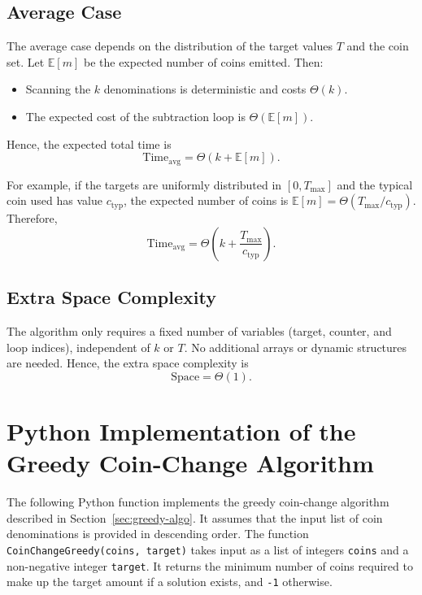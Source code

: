 \documentclass[12pt,a4paper]{report}
\begin{document}
\subsection{Average Case}
The average case depends on the distribution of the target values \(T\) and the coin set. Let \(\mathbb{E}[m]\) be the expected number of coins emitted. Then:

\begin{itemize}
    \item Scanning the \(k\) denominations is deterministic and costs \(\Theta(k)\).
    \item The expected cost of the subtraction loop is \(\Theta(\mathbb{E}[m])\).
\end{itemize}

Hence, the expected total time is
\[
\text{Time}_{\text{avg}} = \Theta\!\left(k + \mathbb{E}[m]\right).
\]

For example, if the targets are uniformly distributed in \([0,T_{\max}]\) and the typical coin used has value \(c_{\mathrm{typ}}\), the expected number of coins is 
\(\mathbb{E}[m] = \Theta(T_{\max} / c_{\mathrm{typ}})\). Therefore,
\[
\text{Time}_{\text{avg}} = \Theta\!\left(k + \frac{T_{\max}}{c_{\mathrm{typ}}}\right).
\]

\subsection{Extra Space Complexity}
The algorithm only requires a fixed number of variables (target, counter, and loop indices), 
independent of \(k\) or \(T\). No additional arrays or dynamic structures are needed. 
Hence, the extra space complexity is
\[
\text{Space} = \Theta(1).
\]


\section{Python Implementation of the Greedy Coin-Change Algorithm}

The following Python function implements the greedy coin-change algorithm described in Section~\ref{sec:greedy-algo}. 
It assumes that the input list of coin denominations is provided in descending order. 
The function \texttt{CoinChangeGreedy(coins, target)} takes input as a list of integers \texttt{coins} and a non-negative integer \texttt{target}. 
It returns the minimum number of coins required to make up the target amount if a solution exists, and \texttt{-1} otherwise. \\
\end{document}

